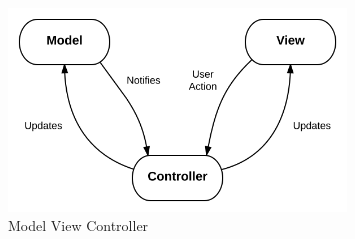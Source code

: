  \begin{figure}[H]
  \centering
  \includegraphics[width=0.8\textwidth,keepaspectratio]{images/all/MVC.png}
  \caption{Model View Controller}
\end{figure}